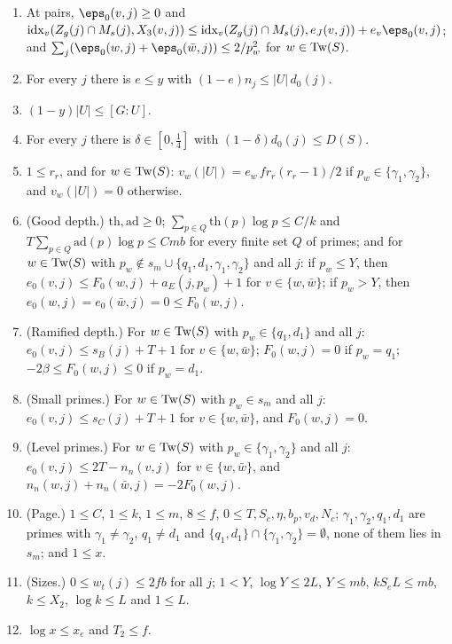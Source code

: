 \begin{definition}[Leaves]
\begin{enumerate}[label=(L\arabic*),leftmargin=*]
\item\label{pf:onto3:L:tw1} At pairs, $\eps_0(v,j)\ge0$ and
$\ontothreeidx_v(Z_g(j)\cap M_s(j),X_3(v,j))\le\ontothreeidx_v(Z_g(j)\cap M_s(j),e_J(v,j))+e_v\eps_0(v,j)$;
and $\sum_j(\eps_0(w,j)+\eps_0(\bar w,j))\le2/p_w^2$ for $w\in\mathrm{Tw}(S)$.
\item\label{pf:onto3:L:share} For every $j$ there is $e\le y$ with $(1-e)n_j\le|U|\,d_0(j)$.
\item\label{pf:onto3:L:indexU} $(1-y)|U|\le[G:U]$.
\item\label{pf:onto3:L:bad} For every $j$ there is $\delta\in[0,\frac14]$ with $(1-\delta)d_0(j)\le D(S)$.
\item\label{pf:onto3:L:unip} $1\le r_r$, and for $w\in\mathrm{Tw}(S)$: $v_w(|U|)=e_w\,fr_r(r_r-1)/2$ if
$p_w\in\{\gamma_1,\gamma_2\}$, and $v_w(|U|)=0$ otherwise.
\item\label{pf:onto3:L:good} (Good depth.) $\mathrm{th},\mathrm{ad}\ge0$; $\sum_{p\in Q}\mathrm{th}(p)\log p\le
C/k$ and $T\sum_{p\in Q}\mathrm{ad}(p)\log p\le Cmb$ for every finite set $Q$ of primes; and for
$w\in\mathrm{Tw}(S)$ with $p_w\notin s_m\cup\{q_1,d_1,\gamma_1,\gamma_2\}$ and all $j$: if $p_w\le Y$, then
$e_0(v,j)\le F_0(w,j)+a_E(j,p_w)+1$ for $v\in\{w,\bar w\}$; if $p_w>Y$, then
$e_0(w,j)=e_0(\bar w,j)=0\le F_0(w,j)$.
\item\label{pf:onto3:L:ram} (Ramified depth.) For $w\in\mathrm{Tw}(S)$ with $p_w\in\{q_1,d_1\}$ and all $j$:
$e_0(v,j)\le s_B(j)+T+1$ for $v\in\{w,\bar w\}$; $F_0(w,j)=0$ if $p_w=q_1$; $-2\beta\le F_0(w,j)\le0$ if
$p_w=d_1$.
\item\label{pf:onto3:L:small} (Small primes.) For $w\in\mathrm{Tw}(S)$ with $p_w\in s_m$ and all $j$:
$e_0(v,j)\le s_C(j)+T+1$ for $v\in\{w,\bar w\}$, and $F_0(w,j)=0$.
\item\label{pf:onto3:L:level} (Level primes.) For $w\in\mathrm{Tw}(S)$ with $p_w\in\{\gamma_1,\gamma_2\}$ and
all $j$: $e_0(v,j)\le2T-n_n(v,j)$ for $v\in\{w,\bar w\}$, and $n_n(w,j)+n_n(\bar w,j)=-2F_0(w,j)$.
\item\label{pf:onto3:L:page} (Page.) $1\le C$, $1\le k$, $1\le m$, $8\le f$, $0\le T,S_c,\eta,b_p,v_d,N_c$;
$\gamma_1,\gamma_2,q_1,d_1$ are primes with $\gamma_1\ne\gamma_2$, $q_1\ne d_1$ and
$\{q_1,d_1\}\cap\{\gamma_1,\gamma_2\}=\emptyset$, none of them lies in $s_m$; and $1\le x$.
\item\label{pf:onto3:L:sizes} (Sizes.) $0\le w_t(j)\le2fb$ for all $j$; $1<Y$, $\log Y\le2L$, $Y\le mb$,
$kS_eL\le mb$, $k\le X_2$, $\log k\le L$ and $1\le L$.
\item\label{pf:onto3:L:x} $\log x\le x_e$ and $T_2\le f$.

\end{enumerate}
\end{definition}
